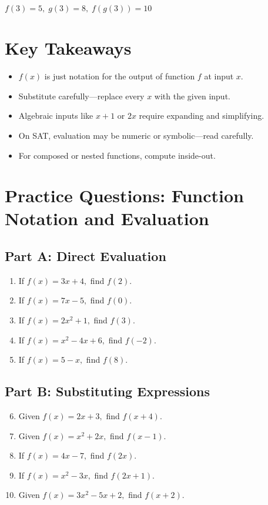 \documentclass[12pt]{article}
\begin{document}
\(\boxed{f(3) = 5,\; g(3) = 8,\; f(g(3)) = 10}\)

\section*{Key Takeaways}
\begin{itemize}
  \item \(f(x)\) is just notation for the output of function \(f\) at input \(x\).
  \item Substitute carefully—replace every \(x\) with the given input.
  \item Algebraic inputs like \(x+1\) or \(2x\) require expanding and simplifying.
  \item On SAT, evaluation may be numeric or symbolic—read carefully.
  \item For composed or nested functions, compute inside-out.
\end{itemize}

\newpage


\section*{Practice Questions: Function Notation and Evaluation}

\subsection*{Part A: Direct Evaluation}
\begin{enumerate}
  \item If \(f(x) = 3x + 4,\) find \(f(2).\)
  \item If \(f(x) = 7x - 5,\) find \(f(0).\)
  \item If \(f(x) = 2x^2 + 1,\) find \(f(3).\)
  \item If \(f(x) = x^2 - 4x + 6,\) find \(f(-2).\)
  \item If \(f(x) = 5 - x,\) find \(f(8).\)
\end{enumerate}

\subsection*{Part B: Substituting Expressions}
\begin{enumerate}
  \setcounter{enumi}{5}
  \item Given \(f(x) = 2x + 3,\) find \(f(x + 4).\)
  \item Given \(f(x) = x^2 + 2x,\) find \(f(x - 1).\)
  \item If \(f(x) = 4x - 7,\) find \(f(2x).\)
  \item If \(f(x) = x^2 - 3x,\) find \(f(2x + 1).\)
  \item Given \(f(x) = 3x^2 - 5x + 2,\) find \(f(x + 2).\)
\end{enumerate}
\end{document}
